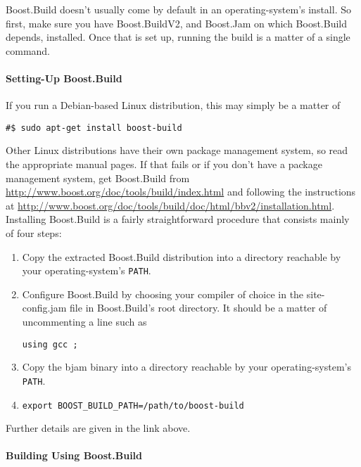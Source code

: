 \documentclass{article}
\begin{document}
Boost.Build doesn't usually come by default in an operating-system's install.
So first, make sure you have Boost.BuildV2, and Boost.Jam on which Boost.Build
depends, installed.  Once that is set up, running the build is a matter of a
single command.


\paragraph{Setting-Up Boost.Build}


If you run a Debian-based Linux distribution, this may simply be a matter of

\begin{verbatim}
#$ sudo apt-get install boost-build
\end{verbatim}

Other Linux distributions have their own package management system, so read the
appropriate manual pages.  If that fails or if you don't have a package
management system, get Boost.Build from
\url{http://www.boost.org/doc/tools/build/index.html} and following the instructions
at \url{http://www.boost.org/doc/tools/build/doc/html/bbv2/installation.html}.
Installing Boost.Build is a fairly straightforward procedure that consists
mainly of four steps:

\begin{enumerate}
  \item Copy the extracted Boost.Build distribution into a directory reachable by
    your operating-system's \texttt{PATH}.
  \item Configure Boost.Build by choosing your compiler of choice in the
    site-config.jam file in Boost.Build's root directory.  It should be a
    matter of uncommenting a line such as

   \begin{verbatim}using gcc ;\end{verbatim}

  \item Copy the bjam binary into a directory reachable by your operating-system's
    \texttt{PATH}.
  \item \texttt{export BOOST\_BUILD\_PATH=/path/to/boost-build}
\end{enumerate}

Further details are given in the link above.

\paragraph{Building Using Boost.Build}
\end{document}
